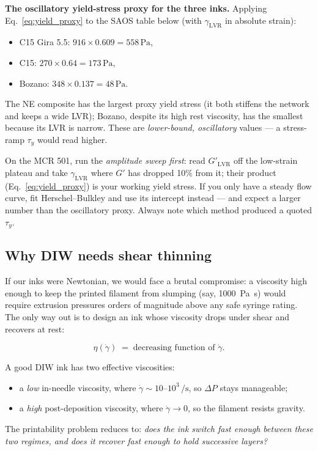 \documentclass[11pt,a4paper]{article}
\newcommand{\gd}{\dot{\gamma}}
\begin{document}
\begin{examplebox}
\textbf{The oscillatory yield-stress proxy for the three inks.} Applying
Eq.~\ref{eq:yield_proxy} to the SAOS table below (with
$\gamma_\mathrm{LVR}$ in absolute strain):
\begin{itemize}[leftmargin=1.6em,itemsep=1pt]
\item C15 Gira 5.5: $916\times0.609 = 558\,\si{\Pa}$,
\item C15: $270\times0.64 = 173\,\si{\Pa}$,
\item Bozano: $348\times0.137 = 48\,\si{\Pa}$.
\end{itemize}
The NE composite has the largest proxy yield stress (it both stiffens the
network and keeps a wide LVR); Bozano, despite its high rest viscosity,
has the smallest because its LVR is narrow. These are \emph{lower-bound,
oscillatory} values --- a stress-ramp $\tau_y$ would read higher.
\end{examplebox}

\begin{inpracticebox}
On the MCR 501, run the \emph{amplitude sweep first}: read $G'_\mathrm{LVR}$
off the low-strain plateau and take $\gamma_\mathrm{LVR}$ where $G'$ has
dropped 10\% from it; their product (Eq.~\ref{eq:yield_proxy}) is your
working yield stress. If you only have a steady flow curve, fit
Herschel--Bulkley and use its intercept instead --- and expect a larger
number than the oscillatory proxy. Always note which method produced a
quoted $\tau_y$.
\end{inpracticebox}

\subsection{Why DIW needs shear thinning}

If our inks were Newtonian, we would face a brutal compromise: a
viscosity high enough to keep the printed filament from slumping
(say, \SI{1000}{\Pa\s}) would require extrusion pressures orders of
magnitude above any safe syringe rating. The only way out is to design
an ink whose viscosity drops under shear and recovers at rest:

\begin{equation}
\eta(\gd) \;=\; \text{decreasing function of } \gd.
\label{eq:shear_thin_general}
\end{equation}

\begin{intuitionbox}
A good DIW ink has two effective viscosities:
\begin{itemize}[leftmargin=1.4em,itemsep=1pt]
\item a \emph{low} in-needle viscosity, where $\gd\sim 10$--$10^3\,\si{\per\s}$,
  so $\Delta P$ stays manageable;
\item a \emph{high} post-deposition viscosity, where $\gd\to 0$, so the
  filament resists gravity.
\end{itemize}
The printability problem reduces to: \emph{does the ink switch fast
enough between these two regimes, and does it recover fast enough to
hold successive layers?}
\end{intuitionbox}
\end{document}
